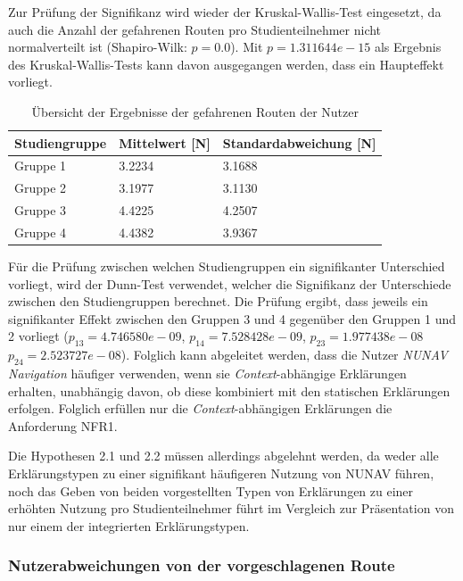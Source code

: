 Zur Prüfung der Signifikanz wird wieder der Kruskal-Wallis-Test eingesetzt, da auch die Anzahl der gefahrenen Routen pro Studienteilnehmer nicht normalverteilt ist (Shapiro-Wilk: $ p = 0.0 $). Mit $ p = 1.311644e-15 $ als Ergebnis des Kruskal-Wallis-Tests kann davon ausgegangen werden, dass ein Haupteffekt vorliegt.

\begin{table}[htb!]
    \centering
    \begin{tabular}{p{}p{}p{}}
        \hline
        Studiengruppe  & Mittelwert [N] & Standardabweichung [N] \\
        \toprule
        Gruppe 1                & 3.2234 & 3.1688 \\
        Gruppe 2                & 3.1977 & 3.1130 \\
        Gruppe 3                & 4.4225 & 4.2507 \\
        Gruppe 4                & 4.4382 & 3.9367 \\
        \bottomrule
    \end{tabular}
    \caption{Übersicht der Ergebnisse der gefahrenen Routen der Nutzer}
    \label{tab:study_usage_results}
\end{table}

Für die Prüfung zwischen welchen Studiengruppen ein signifikanter Unterschied vorliegt, wird der Dunn-Test \cite{dunn1964multiple} verwendet, welcher die Signifikanz der Unterschiede zwischen den Studiengruppen berechnet. Die Prüfung ergibt, dass jeweils ein signifikanter Effekt zwischen den Gruppen 3 und 4 gegenüber den Gruppen 1 und 2 vorliegt ($ p_{13} = 4.746580e-09 $, $ p_{14} = 7.528428e-09 $, $ p_{23} = 1.977438e-08 $ $ p_{24} = 2.523727e-08 $). Folglich kann abgeleitet werden, dass die Nutzer \textit{NUNAV Navigation} häufiger verwenden, wenn sie \textit{Context}-abhängige Erklärungen erhalten, unabhängig davon, ob diese kombiniert mit den statischen Erklärungen erfolgen. Folglich erfüllen nur die \textit{Context}-abhängigen Erklärungen die Anforderung NFR1.

Die Hypothesen 2.1 und 2.2 müssen allerdings abgelehnt werden, da weder alle Erklärungstypen zu einer signifikant häufigeren Nutzung von NUNAV führen, noch das Geben von beiden vorgestellten Typen von Erklärungen zu einer erhöhten Nutzung pro Studienteilnehmer führt im Vergleich zur Präsentation von nur einem der integrierten Erklärungstypen. 

\subsubsection{Nutzerabweichungen von der vorgeschlagenen Route}

